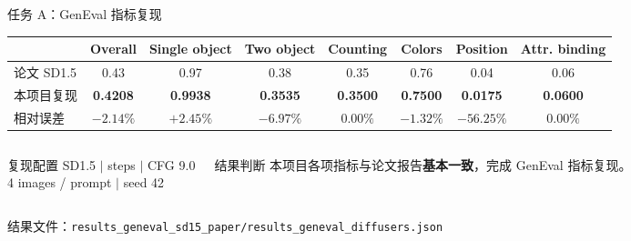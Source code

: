 \documentclass[aspectratio=169,10pt]{beamer}
\newcommand{\result}[1]{\textcolor{T2IBlue}{\bfseries #1}}
\newcommand{\diff}[1]{\textcolor{T2IRed}{\bfseries #1}}
\newcommand{\source}[1]{%
  \vfill\par\scriptsize\color{T2IGray}#1%
}
\begin{document}
\begin{frame}{任务 A：GenEval 指标复现}
  \begin{table}
    \centering\scriptsize
    \setlength{\tabcolsep}{6.5pt}
    \renewcommand{\arraystretch}{1.35}
    \begin{tabular}{lccccccc}
      \toprule
      & Overall & Single object & Two object & Counting & Colors & Position & Attr. binding \\
      \midrule
      论文 SD1.5 & 0.43 & 0.97 & 0.38 & 0.35 & 0.76 & 0.04 & 0.06 \\
      本项目复现 & \result{0.4208} & \result{0.9938} & \result{0.3535} & \result{0.3500} & \result{0.7500} & \result{0.0175} & \result{0.0600} \\
      相对误差 & \diff{$-2.14\%$} & \diff{$+2.45\%$} & \diff{$-6.97\%$} & \diff{$0.00\%$} & \diff{$-1.32\%$} & \diff{$-56.25\%$} & \diff{$0.00\%$} \\
      \bottomrule
    \end{tabular}
  \end{table}

  \vspace{1.0em}
  \begin{columns}[T,onlytextwidth]
      \begin{block}{复现配置}
        \centering\small
        SD1.5 \quad $|$  steps \quad $|$ \quad CFG 9.0\\[0.35em]
        4 images / prompt \quad $|$ \quad seed 42
      \end{block}
      \begin{block}{结果判断}
        \centering\small
        本项目各项指标与论文报告\textbf{基本一致}，完成 GenEval 指标复现。
      \end{block}
  \end{columns}
  \source{结果文件：\texttt{results\_geneval\_sd15\_paper/results\_geneval\_diffusers.json}}
\end{frame}

\end{document}
